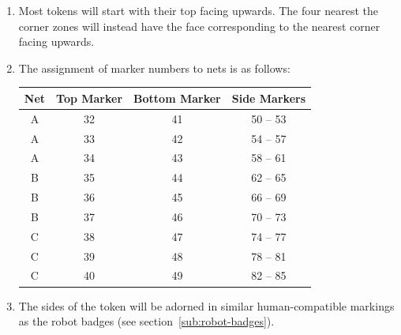 \begin{enumerate}
\item Most tokens will start with their top facing upwards.
      The four nearest the corner zones will instead have the face corresponding to the nearest corner facing upwards.

\item The assignment of marker numbers to nets is as follows:
\begin{center}
  \begin{tabular}{cccc}
    \toprule
    \textbf{Net} & \textbf{Top Marker} & \textbf{Bottom Marker} & \textbf{Side Markers} \\
    \midrule
    A & 32 & 41 & 50 -- 53 \\
    A & 33 & 42 & 54 -- 57 \\
    A & 34 & 43 & 58 -- 61 \\
    B & 35 & 44 & 62 -- 65 \\
    B & 36 & 45 & 66 -- 69 \\
    B & 37 & 46 & 70 -- 73 \\
    C & 38 & 47 & 74 -- 77 \\
    C & 39 & 48 & 78 -- 81 \\
    C & 40 & 49 & 82 -- 85 \\
    \bottomrule
  \end{tabular}
\end{center}

\item The sides of the token will be adorned in similar human-compatible markings as the robot badges (see section~\ref{sub:robot-badges}).

\end{enumerate}

\clearpage

